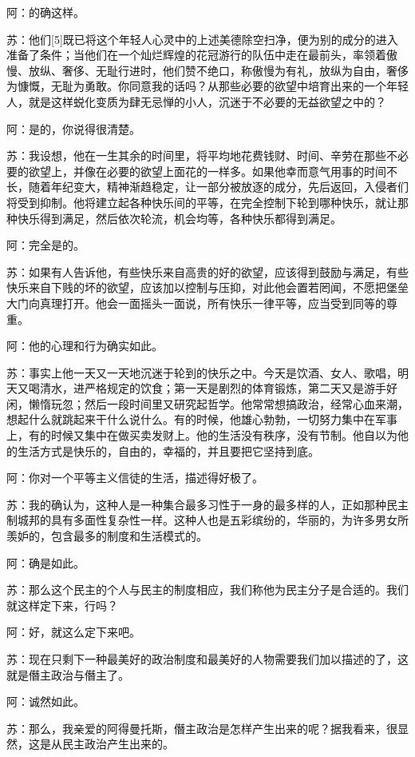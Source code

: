 \documentclass[12pt,oneside]{book}
\begin{document}
阿：的确这样。

苏：他们[5]既已将这个年轻人心灵中的上述美德除空扫净，便为别的成分的进入准备了条件；当他们在一个灿烂辉煌的花冠游行的队伍中走在最前头，率领着傲慢、放纵、奢侈、无耻行进时，他们赞不绝口，称傲慢为有礼，放纵为自由，奢侈为慷慨，无耻为勇敢。你同意我的话吗？从那些必要的欲望中培育出来的一个年轻人，就是这样蜕化变质为肆无忌惮的小人，沉迷于不必要的无益欲望之中的？

阿：是的，你说得很清楚。

苏：我设想，他在一生其余的时间里，将平均地花费钱财、时间、辛劳在那些不必要的欲望上，并像在必要的欲望上面花的一样多。如果他幸而意气用事的时间不长，随着年纪变大，精神渐趋稳定，让一部分被放逐的成分，先后返回，入侵者们将受到抑制。他将建立起各种快乐间的平等，在完全控制下轮到哪种快乐，就让那种快乐得到满足，然后依次轮流，机会均等，各种快乐都得到满足。

阿：完全是的。

苏：如果有人告诉他，有些快乐来自高贵的好的欲望，应该得到鼓励与满足，有些快乐来自下贱的坏的欲望，应该加以控制与压抑，对此他会置若罔闻，不愿把堡垒大门向真理打开。他会一面摇头一面说，所有快乐一律平等，应当受到同等的尊重。

阿：他的心理和行为确实如此。

苏：事实上他一天又一天地沉迷于轮到的快乐之中。今天是饮酒、女人、歌唱，明天又喝清水，进严格规定的饮食；第一天是剧烈的体育锻炼，第二天又是游手好闲，懒惰玩忽；然后一段时间里又研究起哲学。他常常想搞政治，经常心血来潮，想起什么就跳起来干什么说什么。有的时候，他雄心勃勃，一切努力集中在军事上，有的时候又集中在做买卖发财上。他的生活没有秩序，没有节制。他自以为他的生活方式是快乐的，自由的，幸福的，并且要把它坚持到底。

阿：你对一个平等主义信徒的生活，描述得好极了。

苏：我的确认为，这种人是一种集合最多习性于一身的最多样的人，正如那种民主制城邦的具有多面性复杂性一样。这种人也是五彩缤纷的，华丽的，为许多男女所羡妒的，包含最多的制度和生活模式的。

阿：确是如此。

苏：那么这个民主的个人与民主的制度相应，我们称他为民主分子是合适的。我们就这样定下来，行吗？

阿：好，就这么定下来吧。

苏：现在只剩下一种最美好的政治制度和最美好的人物需要我们加以描述的了，这就是僭主政治与僭主了。

阿：诚然如此。

苏：那么，我亲爱的阿得曼托斯，僭主政治是怎样产生出来的呢？据我看来，很显然，这是从民主政治产生出来的。
\end{document}
